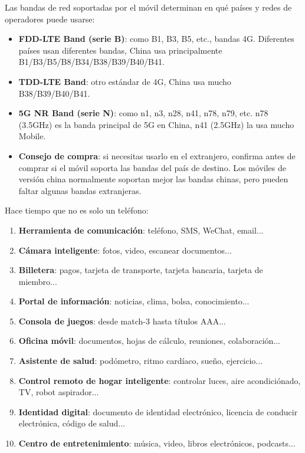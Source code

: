 Las bandas de red soportadas por el móvil determinan en qué países y redes de operadores puede usarse:

\begin{itemize}
  \item \textbf{FDD-LTE Band (serie B)}: como B1, B3, B5, etc., bandas 4G. Diferentes países usan diferentes bandas, China usa principalmente B1/B3/B5/B8/B34/B38/B39/B40/B41.
  \item \textbf{TDD-LTE Band}: otro estándar de 4G, China usa mucho B38/B39/B40/B41.
  \item \textbf{5G NR Band (serie N)}: como n1, n3, n28, n41, n78, n79, etc. n78 (3.5GHz) es la banda principal de 5G en China, n41 (2.5GHz) la usa mucho Mobile.
  \item \textbf{Consejo de compra}: si necesitas usarlo en el extranjero, confirma antes de comprar si el móvil soporta las bandas del país de destino. Los móviles de versión china normalmente soportan mejor las bandas chinas, pero pueden faltar algunas bandas extranjeras.
\end{itemize}


Hace tiempo que no es solo un teléfono:

\begin{enumerate}
  \item \textbf{Herramienta de comunicación}: teléfono, SMS, WeChat, email...
  \item \textbf{Cámara inteligente}: fotos, video, escanear documentos...
  \item \textbf{Billetera}: pagos, tarjeta de transporte, tarjeta bancaria, tarjeta de miembro...
  \item \textbf{Portal de información}: noticias, clima, bolsa, conocimiento...
  \item \textbf{Consola de juegos}: desde match-3 hasta títulos AAA...
  \item \textbf{Oficina móvil}: documentos, hojas de cálculo, reuniones, colaboración...
  \item \textbf{Asistente de salud}: podómetro, ritmo cardíaco, sueño, ejercicio...
  \item \textbf{Control remoto de hogar inteligente}: controlar luces, aire acondiciónado, TV, robot aspirador...
  \item \textbf{Identidad digital}: documento de identidad electrónico, licencia de conducir electrónica, código de salud...
  \item \textbf{Centro de entretenimiento}: música, video, libros electrónicos, podcasts...
\end{enumerate}

